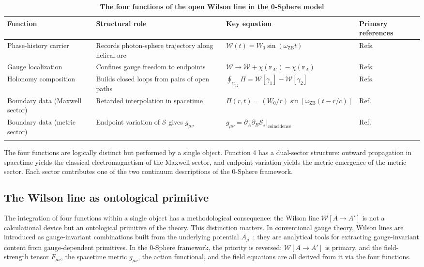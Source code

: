 \documentclass[%
 reprint, amsmath,amssymb, aps, prb, ]{revtex4-2}
\numberwithin{equation}{section}
\newcommand{\omZB}{\omega_{\text{ZB}}}
\newcommand{\WL}{\mathcal{W}}
\begin{document}
\begin{table}[t!]
\centering
\caption{\textbf{The four functions of the open Wilson line in the 0-Sphere model}}
\label{tab:functions}
\renewcommand{\arraystretch}{1.4}
\begin{tabular}{p{3.0cm}p{4.0cm}p{3.8cm}p{4.2cm}}
\toprule
\textbf{Function} & \textbf{Structural role} & \textbf{Key equation} & \textbf{Primary references} \\
\midrule
Phase-history carrier
& Records photon-sphere trajectory along helical arc
& $\WL(t) = W_0 \sin(\omZB t)$
& Refs.~\cite{hanamura29, hanamura31, hanamura43, hanamura51} \\
\addlinespace[0.3cm]
Gauge localization
& Confines gauge freedom to endpoints
& $\WL \to \WL + \chi(\mathbf{r}_{A'}) - \chi(\mathbf{r}_A)$
& Refs.~\cite{hanamura17, hanamura45} \\
\addlinespace[0.3cm]
Holonomy composition
& Builds closed loops from pairs of open paths
& $\oint_{C_{12}} \Pi = \WL[\gamma_1] - \WL[\gamma_2]$
& Refs.~\cite{hanamura31, hanamura43} \\
\addlinespace[0.3cm]
Boundary data (Maxwell sector)
& Retarded interpolation in spacetime
& $\Pi(r,t) = (W_0/r)\sin[\omZB(t-r/c)]$
& Ref.~\cite{hanamura54} \\
\addlinespace[0.3cm]
Boundary data (metric sector)
& Endpoint variation of $\mathcal{S}$ gives $g_{\mu\nu}$
& $g_{\mu\nu} = \partial_A\partial_B\mathcal{S}_s|_{\text{coincidence}}$
& Ref.~\cite{hanamura51} \\
\addlinespace[0.2cm]
\bottomrule
\end{tabular}
\vspace{0.2cm}
\begin{minipage}{0.95\textwidth}
\justifying\footnotesize
The four functions are logically distinct but performed by a single object. Function 4 has a dual-sector structure: outward propagation in spacetime yields the classical electromagnetism of the Maxwell sector, and endpoint variation yields the metric emergence of the metric sector. Each sector contributes one of the two continuum descriptions of the 0-Sphere framework.
\end{minipage}
\end{table}

\subsection{The Wilson line as ontological primitive}

The integration of four functions within a single object has a methodological consequence: the Wilson line $\WL[A\to A']$ is not a calculational device but an ontological primitive of the theory. This distinction matters. In conventional gauge theory, Wilson lines are introduced as gauge-invariant combinations built from the underlying potential $A_\mu$~\cite{Mandelstam1968, Polyakov1979}; they are analytical tools for extracting gauge-invariant content from gauge-dependent primitives. In the 0-Sphere framework, the priority is reversed: $\WL[A\to A']$ is primary, and the field-strength tensor $F_{\mu\nu}$, the spacetime metric $g_{\mu\nu}$, the action functional, and the field equations are all derived from it via the four functions.
\end{document}
